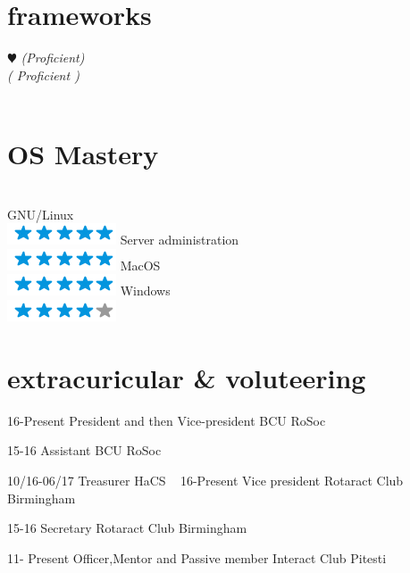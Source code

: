 \documentclass[]{friggeri-cv}
\begin{document}
\newpage

\begin{aside2}
  \section{frameworks}
    {\color{red} $\varheartsuit$}
     \emph{(Proficient)} \\
     \emph{( Proficient )} \\
     \\

  \section{OS Mastery}
  \\GNU/Linux  \\\includegraphics[scale=0.30]{img/5stars.png}
  Server administration \\\includegraphics[scale=0.30]{img/5stars.png}
  MacOS  \\\includegraphics[scale=0.30]{img/5stars.png}
  Windows  \\\includegraphics[scale=0.30]{img/4stars.png}
\end{aside2}


\section{extracuricular \& voluteering}
\begin{entrylist}




    \entry
    {16-Present}
    {President and then Vice-president}
    {BCU RoSoc}

    \entry
    {15-16}
    {Assistant}
    {BCU RoSoc}

     \entry
    {10/16-06/17}
    {Treasurer}
    {HaCS}
    ~
     \entry
    {16-Present}
    {Vice president}
    {Rotaract Club Birmingham}

    \entry
    {15-16}
    {Secretary}
    {Rotaract Club Birmingham}
    ~

    \entry
    {11- Present}
    {Officer,Mentor and Passive member}
    {Interact Club Pitesti}
    ~
\end{entrylist}
\end{document}
